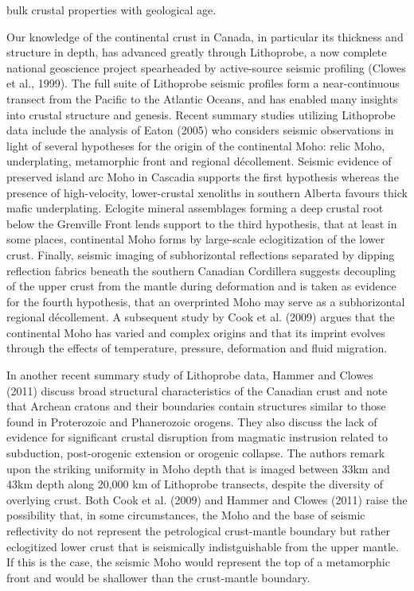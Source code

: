 \documentclass[review]{elsarticle}
\begin{document}
bulk crustal properties with geological age.

Our knowledge of the continental crust in Canada, in particular its thickness and structure in depth, has advanced greatly through Lithoprobe, a now complete national geoscience project spearheaded by active-source seismic profiling (Clowes et al., 1999). The full suite of Lithoprobe seismic profiles form a near-continuous transect from the Pacific to the Atlantic Oceans, and has enabled many insights into crustal structure and genesis. Recent summary studies utilizing Lithoprobe data include the analysis of Eaton (2005) who considers seismic observations in light of several hypotheses for the origin of the continental Moho: relic Moho, underplating, metamorphic front and regional d\'ecollement. Seismic evidence of preserved island arc Moho in Cascadia supports the first hypothesis whereas the presence of high-velocity, lower-crustal xenoliths in southern Alberta favours thick mafic underplating. Eclogite mineral assemblages forming a deep crustal root below the Grenville Front lends support to the third hypothesis, that at least in some places, continental Moho forms by large-scale eclogitization of the lower crust. Finally, seismic imaging of subhorizontal reflections separated by dipping reflection fabrics beneath the southern Canadian Cordillera suggests decoupling of the upper crust from the mantle during deformation and is taken as evidence for the fourth hypothesis, that an overprinted Moho may serve as a subhorizontal regional d\'ecollement. A subsequent study by Cook et al. (2009) argues that the continental Moho has varied and complex origins and that its imprint evolves through the effects of temperature, pressure, deformation and fluid migration.

In another recent summary study of Lithoprobe data, Hammer and Clowes (2011) discuss broad structural characteristics of the Canadian crust and note that Archean cratons and their boundaries contain structures similar to those found in Proterozoic and Phanerozoic orogens. They also discuss the lack of evidence for significant crustal disruption from magmatic instrusion related to subduction, post-orogenic extension or orogenic collapse. The authors remark upon the striking uniformity in Moho depth that is imaged between 33km and 43km depth along 20,000 km of Lithoprobe transects, despite the diversity of overlying crust. Both Cook et al. (2009) and Hammer and Clowes (2011) raise the possibility that, in some circumstances, the Moho and the base of seismic reflectivity do not represent the petrological crust-mantle boundary but rather eclogitized lower crust that is seismically indistguishable from the upper mantle. If this is the case, the seismic Moho would represent the top of a metamorphic front and would be shallower than the crust-mantle boundary.
\end{document}
